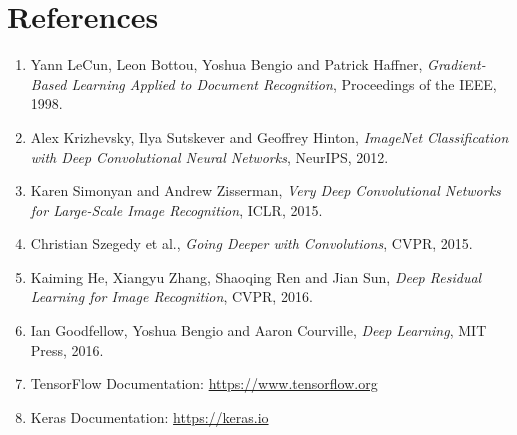 \documentclass[11pt]{article}
\begin{document}
\section{References}
\begin{enumerate}[leftmargin=*]
    \item Yann LeCun, Leon Bottou, Yoshua Bengio and Patrick Haffner, \textit{Gradient-Based Learning Applied to Document Recognition}, Proceedings of the IEEE, 1998.
    \item Alex Krizhevsky, Ilya Sutskever and Geoffrey Hinton, \textit{ImageNet Classification with Deep Convolutional Neural Networks}, NeurIPS, 2012.
    \item Karen Simonyan and Andrew Zisserman, \textit{Very Deep Convolutional Networks for Large-Scale Image Recognition}, ICLR, 2015.
    \item Christian Szegedy et al., \textit{Going Deeper with Convolutions}, CVPR, 2015.
    \item Kaiming He, Xiangyu Zhang, Shaoqing Ren and Jian Sun, \textit{Deep Residual Learning for Image Recognition}, CVPR, 2016.
    \item Ian Goodfellow, Yoshua Bengio and Aaron Courville, \textit{Deep Learning}, MIT Press, 2016.
    \item TensorFlow Documentation: \url{https://www.tensorflow.org}
    \item Keras Documentation: \url{https://keras.io}
\end{enumerate}
\end{document}
